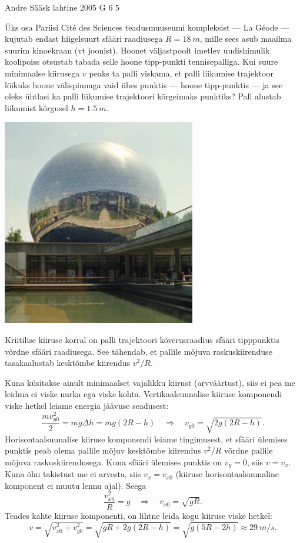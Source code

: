 {Andre Sääsk} %
{lahtine} %
{2005} %
{G 6} %
{5} %
{
\ifStatement
Üks osa Pariisi Cité des Sciences teadusmuuseumi kompleksist --- La Géode --- kujutab endast hiigelsuurt sfääri raadiusega $R = \SI{18}{m}$, mille sees asub maailma suurim kinoekraan (vt joonist). Hoonet väljastpoolt imetlev uudishimulik koolipoiss otsustab tabada selle hoone tipp-punkti tennisepalliga. Kui suure minimaalse kiirusega $v$ peaks ta palli viskama, et palli liikumise trajektoor lõikuks hoone välispinnaga vaid ühes punktis --- hoone tipp-punktis --- ja see oleks ühtlasi ka palli liikumise trajektoori kõrgeimaks punktiks? Pall alustab liikumist kõrgusel $h = \SI{1,5}{m}$.

\begin{center}
	\includegraphics[width=0.5\linewidth]{2005-lahg-06-yl}
\end{center}
\fi


\ifHint
Kriitilise kiiruse korral on palli trajektoori kõverusraadius sfääri tipppunktis võrdne sfääri raadiusega. See tähendab, et pallile mõjuva raskuskiirenduse tasakaalustab kesktõmbe kiirendus $v^2/R$.
\fi


\ifSolution
Kuna küsitakse ainult minimaalset vajalikku kiirust (arvväärtust), siis ei pea me leidma ei viske nurka ega viske kohta. Vertikaalsuunalise kiiruse komponendi viske hetkel leiame energia jäävuse seadusest:
\[
\frac{m v_{y 0}^{2}}{2}=m g \Delta h=m g(2 R-h) \quad \Rightarrow \quad v_{y 0}=\sqrt{2 g(2 R-h)}.
\]
Horisontaalsuunalise kiiruse komponendi leiame tingimusest, et sfääri ülemises punktis peab olema pallile mõjuv kesktõmbe kiirendus $v^2/R$ võrdne pallile mõjuva raskuskiirendusega. Kuna sfääri ülemises punktis on $v_y = 0$, siis $v = v_x$. Kuna õhu takistust me ei arvesta, siis $v_x = v_{x0}$ (kiiruse horisontaalsuunaline komponent ei muutu lennu ajal). Seega
\[
\frac{v_{x 0}^{2}}{R}=g \quad \Rightarrow \quad v_{x 0}=\sqrt{g R}.
\]
Teades kahte kiiruse komponenti, on lihtne leida kogu kiiruse viske hetkel:
\[
v=\sqrt{v_{x 0}^{2}+v_{y 0}^{2}}=\sqrt{g R+2 g(2 R-h)}=\sqrt{g(5 R-2 h)} \approx \SI{29}{m/s}.
\]

}
